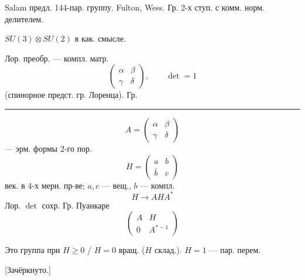 Salam предл. 144-пар. группу.
Fulton, Wess.
Гр. 2-х ступ. с комм. норм. делителем.
\par\noindent\begin{minipage}{\linewidth}
$SU(3)\otimes SU(2)$ в как. смысле.
\end{minipage}\par
Лор. преобр. — компл. матр.
\begin{equation*}
\begin{pmatrix}\alpha&\beta\\\gamma&\delta\end{pmatrix},
\qquad \det=1
\end{equation*}
(спинорное предст. гр. Лоренца).
Гр. \enspace\rule[-.28em]{.6pt}{1.4em}
\begin{equation*}
A=\begin{pmatrix}\alpha&\beta\\\gamma&\delta\end{pmatrix}
\end{equation*}
 — эрм. формы 2-го пор.
\begin{equation*}
H=\begin{pmatrix}a&b\\\bar b&c\end{pmatrix}
\end{equation*}
век. в 4-х мерн. пр-ве; $a,c$ — вещ., $b$ — компл.
\begin{equation*}
H\to AHA^*
\end{equation*}
Лор. $\det$ сохр.
Гр. Пуанкаре
\begin{equation*}
\begin{pmatrix}A&H\\0&A^{*-1}\end{pmatrix}
\end{equation*}
\par\noindent\begin{minipage}{\linewidth}
Это группа при $H\geq0$ / $H=0$ вращ. ($H$ склад.).
$H=1$ — пар. перем.
\end{minipage}\par
\par\noindent\begin{minipage}{\linewidth}
[Зачёркнуто.]
\end{minipage}\par
